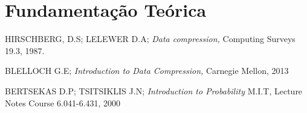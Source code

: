 \documentclass[
	12pt,					%
	openright,				%
	twoside,					%
	a4paper,					%
	english,					%
	brazil					%
	]{abntex2}
\begin{document}


\part{Fundamentação Teórica}


%
%

%

%
%

\postextual

\begin{thebibliography}{9999}  
HIRSCHBERG, D.S; LELEWER D.A;
\emph{Data compression, }Computing Surveys 19.3, 1987.

BLELLOCH G.E;
\emph{Introduction to Data Compression, } Carnegie Mellon, 2013

 BERTSEKAS D.P; TSITSIKLIS J.N;
\emph{Introduction to Probability} M.I.T, Lecture Notes Course 6.041-6.431, 2000

\end{thebibliography}
	

% 

% 

\end{document}
